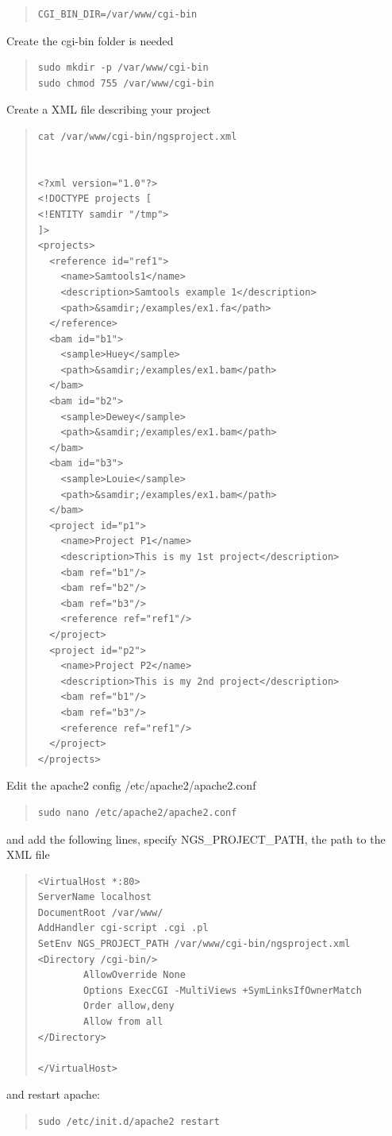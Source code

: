 \documentclass[12pt]{article}
\begin{document}
\begin{quote}
\begin{verbatim}
CGI_BIN_DIR=/var/www/cgi-bin
\end{verbatim}
\end{quote}
Create the cgi-bin folder is needed
\begin{quote}
\begin{verbatim}
sudo mkdir -p /var/www/cgi-bin
sudo chmod 755 /var/www/cgi-bin
\end{verbatim}
\end{quote}
Create a XML file describing your project
\begin{quote}
\begin{verbatim}
cat /var/www/cgi-bin/ngsproject.xml  


<?xml version="1.0"?>
<!DOCTYPE projects [
<!ENTITY samdir "/tmp">
]>
<projects>
  <reference id="ref1">
    <name>Samtools1</name>
    <description>Samtools example 1</description>
    <path>&samdir;/examples/ex1.fa</path>
  </reference>
  <bam id="b1">
    <sample>Huey</sample>
    <path>&samdir;/examples/ex1.bam</path>
  </bam>
  <bam id="b2">
    <sample>Dewey</sample>
    <path>&samdir;/examples/ex1.bam</path>
  </bam>
  <bam id="b3">
    <sample>Louie</sample>
    <path>&samdir;/examples/ex1.bam</path>
  </bam>
  <project id="p1">
    <name>Project P1</name>
    <description>This is my 1st project</description>
    <bam ref="b1"/>
    <bam ref="b2"/>
    <bam ref="b3"/>
    <reference ref="ref1"/>
  </project>
  <project id="p2">
    <name>Project P2</name>
    <description>This is my 2nd project</description>
    <bam ref="b1"/>
    <bam ref="b3"/>
    <reference ref="ref1"/>
  </project>
</projects>
\end{verbatim}
\end{quote}
Edit the apache2 config /etc/apache2/apache2.conf
\begin{quote}
\begin{verbatim}
sudo nano /etc/apache2/apache2.conf
\end{verbatim}
\end{quote}
and add the following lines, specify NGS\_PROJECT\_PATH, the path to the XML file
\begin{quote}
\begin{verbatim}
<VirtualHost *:80>
ServerName localhost
DocumentRoot /var/www/
AddHandler cgi-script .cgi .pl 
SetEnv NGS_PROJECT_PATH /var/www/cgi-bin/ngsproject.xml    
<Directory /cgi-bin/>
        AllowOverride None
        Options ExecCGI -MultiViews +SymLinksIfOwnerMatch
        Order allow,deny
        Allow from all    
</Directory>

</VirtualHost>

\end{verbatim}
\end{quote}
and restart apache:
\begin{quote}
\begin{verbatim}
sudo /etc/init.d/apache2 restart
\end{verbatim}
\end{quote}
\end{document}
